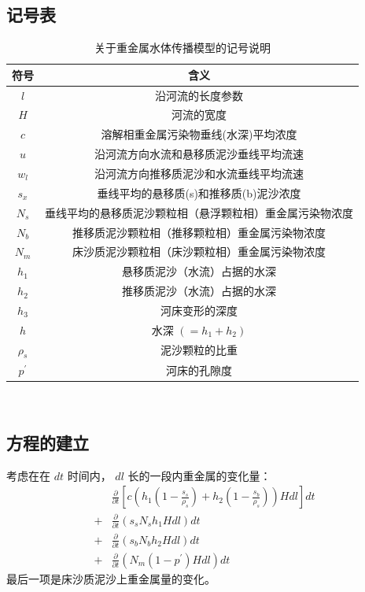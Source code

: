 \documentclass[a4paper]{article}
\begin{document}
\subsection{记号表}
\begin{table}[H]
	\centering
	\caption{关于重金属水体传播模型的记号说明}
	\label{tab:water_model_symbols}
	\begin{tabular}{cc}
		\hline
		符号 & 含义  \\
		\hline
		$l$ & 沿河流的长度参数   \\
		$H$ & 河流的宽度  \\
		$c$ & 溶解相重金属污染物垂线(水深)平均浓度  \\
		$u$ & 沿河流方向水流和悬移质泥沙垂线平均流速 \\
		$w_l$ & 沿河流方向推移质泥沙和水流垂线平均流速      \\
		$s_x$ & 垂线平均的悬移质(s)和推移质(b)泥沙浓度      \\
		$N_s$ & 垂线平均的悬移质泥沙颗粒相（悬浮颗粒相）重金属污染物浓度 \\
		$N_b$ & 推移质泥沙颗粒相（推移颗粒相）重金属污染物浓度 \\
		$N_m$ & 床沙质泥沙颗粒相（床沙颗粒相）重金属污染物浓度 \\
		$h_1$ & 悬移质泥沙（水流）占据的水深 \\
		$h_2$ & 推移质泥沙（水流）占据的水深 \\
		$h_3$ & 河床变形的深度 \\
		$h$ & 水深 $(=h_1+h_2)$ \\
		$\rho_s$ & 泥沙颗粒的比重 \\
		$p^{'}$ & 河床的孔隙度 \\
		\hline	
	\end{tabular} \\
\end{table}
\subsection{方程的建立}
考虑在在 $dt$ 时间内， $dl$ 长的一段内重金属的变化量：
\[ \begin{split}
&\frac{\partial}{\partial t}\left[c\left(h_1\left(1-\frac{s_s}{\rho_s}\right) + h_2\left(1-\frac{s_b}{\rho_s}\right)\right)Hdl\right]dt \\
+ &\frac{\partial}{\partial t}(s_sN_sh_1Hdl)dt \\
+ &\frac{\partial}{\partial t}(s_bN_bh_2Hdl)dt \\
+ &\frac{\partial}{\partial t}(N_m(1-p^{'})Hdl)dt 
\end{split} \]
最后一项是床沙质泥沙上重金属量的变化。
\end{document}
